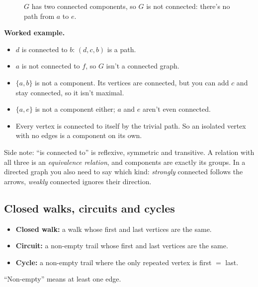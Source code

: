 \begin{figure}[H]
\centering
{}
\caption{$G$ has two connected components, so $G$ is not connected: there's no path from $a$ to $e$.}
\end{figure}

\textbf{Worked example.}
\begin{itemize}
\item $d$ is connected to $b$: $(d,c,b)$ is a path.
\item $a$ is not connected to $f$, so $G$ isn't a connected graph.
\item $\{a,b\}$ is not a component. Its vertices are connected, but you can add $c$ and stay connected, so it isn't maximal.
\item $\{a,e\}$ is not a component either; $a$ and $e$ aren't even connected.
\item Every vertex is connected to itself by the trivial path. So an isolated vertex with no edges is a component on its own.
\end{itemize}

Side note: ``is connected to'' is reflexive, symmetric and transitive. A relation with all three is an \emph{equivalence relation}, and components are exactly its groups. In a directed graph you also need to say which kind: \emph{strongly} connected follows the arrows, \emph{weakly} connected ignores their direction.

\subsection{Closed walks, circuits and cycles}

\begin{notebox}
\begin{itemize}
\item \textbf{Closed walk:} a walk whose first and last vertices are the same.
\item \textbf{Circuit:} a non-empty trail whose first and last vertices are the same.
\item \textbf{Cycle:} a non-empty trail where the only repeated vertex is first $=$ last.
\end{itemize}
``Non-empty'' means at least one edge.
\end{notebox}

